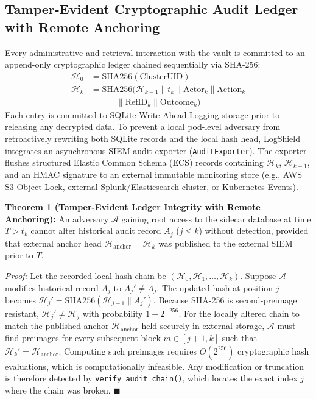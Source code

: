 \documentclass[conference]{IEEEtran}
\begin{document}
\subsection{Tamper-Evident Cryptographic Audit Ledger with Remote Anchoring}
Every administrative and retrieval interaction with the vault is committed to an append-only cryptographic ledger chained sequentially via SHA-256:
\begin{align}
    \mathcal{H}_0 &= \text{SHA256}(\text{ClusterUID}) \\
    \mathcal{H}_k &= \text{SHA256}(\mathcal{H}_{k-1} \parallel t_k \parallel \text{Actor}_k \parallel \text{Action}_k \nonumber \\
    &\qquad\quad \parallel \text{RefID}_k \parallel \text{Outcome}_k)
\end{align}
Each entry is committed to SQLite Write-Ahead Logging storage prior to releasing any decrypted data. To prevent a local pod-level adversary from retroactively rewriting both SQLite records and the local hash head, LogShield integrates an asynchronous SIEM audit exporter (\texttt{AuditExporter}). The exporter flushes structured Elastic Common Schema (ECS) records containing $\mathcal{H}_k$, $\mathcal{H}_{k-1}$, and an HMAC signature to an external immutable monitoring store (e.g., AWS S3 Object Lock, external Splunk/Elasticsearch cluster, or Kubernetes Events).

\textbf{Theorem 1 (Tamper-Evident Ledger Integrity with Remote Anchoring):} An adversary $\mathcal{A}$ gaining root access to the sidecar database at time $T > t_k$ cannot alter historical audit record $A_j$ ($j \le k$) without detection, provided that external anchor head $\mathcal{H}_{\text{anchor}} = \mathcal{H}_k$ was published to the external SIEM prior to $T$.

\textit{Proof:} Let the recorded local hash chain be $(\mathcal{H}_0, \mathcal{H}_1, \dots, \mathcal{H}_k)$. Suppose $\mathcal{A}$ modifies historical record $A_j$ to $A_j' \neq A_j$. The updated hash at position $j$ becomes $\mathcal{H}_j' = \text{SHA256}(\mathcal{H}_{j-1} \parallel A_j')$. Because SHA-256 is second-preimage resistant, $\mathcal{H}_j' \neq \mathcal{H}_j$ with probability $1 - 2^{-256}$. For the locally altered chain to match the published anchor $\mathcal{H}_{\text{anchor}}$ held securely in external storage, $\mathcal{A}$ must find preimages for every subsequent block $m \in [j+1, k]$ such that $\mathcal{H}_k' = \mathcal{H}_{\text{anchor}}$. Computing such preimages requires $O(2^{256})$ cryptographic hash evaluations, which is computationally infeasible. Any modification or truncation is therefore detected by \texttt{verify\_audit\_chain()}, which locates the exact index $j$ where the chain was broken. \hfill $\blacksquare$
\end{document}
